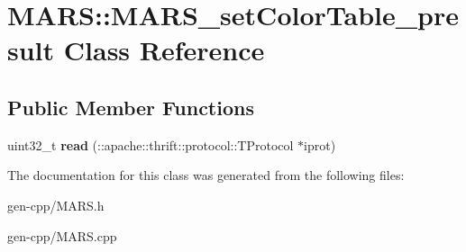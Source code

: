 \hypertarget{classMARS_1_1MARS__setColorTable__presult}{}\section{M\+A\+RS\+:\+:M\+A\+R\+S\+\_\+set\+Color\+Table\+\_\+presult Class Reference}
\label{classMARS_1_1MARS__setColorTable__presult}
\subsection*{Public Member Functions}
\begin{DoxyCompactItemize}
\item 
\mbox{\label{classMARS_1_1MARS__setColorTable__presult_a146e180d26031266bbc3d86cfbcfd26c}} 
uint32\+\_\+t {\bfseries read} (\+::apache\+::thrift\+::protocol\+::\+T\+Protocol $\ast$iprot)
\end{DoxyCompactItemize}


The documentation for this class was generated from the following files\+:\begin{DoxyCompactItemize}
\item 
gen-\/cpp/M\+A\+R\+S.\+h\item 
gen-\/cpp/M\+A\+R\+S.\+cpp\end{DoxyCompactItemize}
